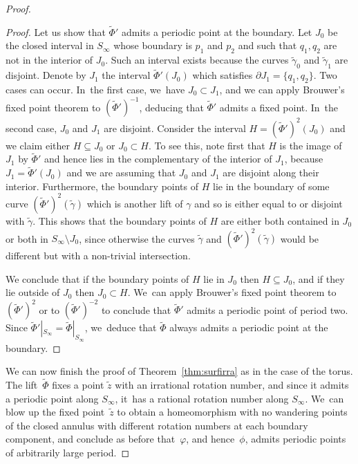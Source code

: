 \begin{proof}
\begin{proof}
Let us show that $\widetilde \Phi'$ admits a periodic point at the boundary. Let $J_0$ be the closed interval in $S_\infty$ whose boundary is $p_1$ and $p_2$ and such that $q_1,q_2$ are not in the interior of $J_0$. Such an interval exists because the curves $\widetilde \gamma_0$ and $\widetilde \gamma_1$ are disjoint. Denote by $J_1$ the interval $\widetilde \Phi'(J_0)$ which satisfies $\partial J_1=\{q_1,q_2\}$. Two cases can occur. In~the first case, we~have $J_0\subset J_1$, and we can apply Brouwer's fixed point theorem to $(\widetilde \Phi')^{-1}$, deducing that $\widetilde \Phi'$ admits a fixed point. In~the second case, $J_0$ and $J_1$ are disjoint. Consider the interval $H=(\widetilde \Phi')^2(J_0)$ and we claim either $H\subseteq J_0$ or $J_0\subset H$. To see this, note first that $H$ is the image of $J_1$ by $\widetilde \Phi'$ and hence lies in the complementary of the interior of $J_1$, because $J_1=\widetilde \Phi'(J_0)$ and we are assuming that $J_0$ and $J_1$ are disjoint along their interior. Furthermore, the boundary points of $H$ lie in the boundary of some curve $(\widetilde \Phi')^2(\widetilde \gamma)$ which is another lift of $\gamma$ and so is either equal to or disjoint with $\widetilde \gamma$. This shows that the boundary points of $H$ are either both contained in $J_0$ or both in $S_\infty\setminus J_0$, since otherwise the curves $\widetilde \gamma$ and $(\widetilde \Phi')^2(\widetilde \gamma)$ would be different but with a non-trivial intersection.

We conclude that if the boundary points of $H$ lie in $J_0$ then $H\subseteq J_0$, and if they lie outside of $J_0$ then $J_0\subset H$. We~can apply Brouwer's fixed point theorem to $(\widetilde \Phi')^2$ or to $(\widetilde \Phi')^{-2}$ to conclude that $\widetilde \Phi'$ admits a periodic point of period two. Since $\widetilde \Phi'|_{S_\infty}=\widetilde \Phi|_{S_\infty}$, we~deduce that $\widetilde\Phi $ always admits a periodic point at the boundary.
\end{proof}

We can now finish the proof of Theorem~\ref{thm:surfirra} as in the case of the torus. The lift~$\widetilde \Phi$ fixes a point $\widetilde z$ with an irrational rotation number, and since it admits a periodic point along $S_{\infty}$, it~has a rational rotation number along $S_\infty$. We~can blow up the fixed point~$\widetilde{z}$ to obtain a homeomorphism with no wandering points of the closed annulus with different rotation numbers at each boundary component, and conclude as before that~$\varphi$, and hence~$\phi$, admits periodic points of arbitrarily large period.
\end{proof}

